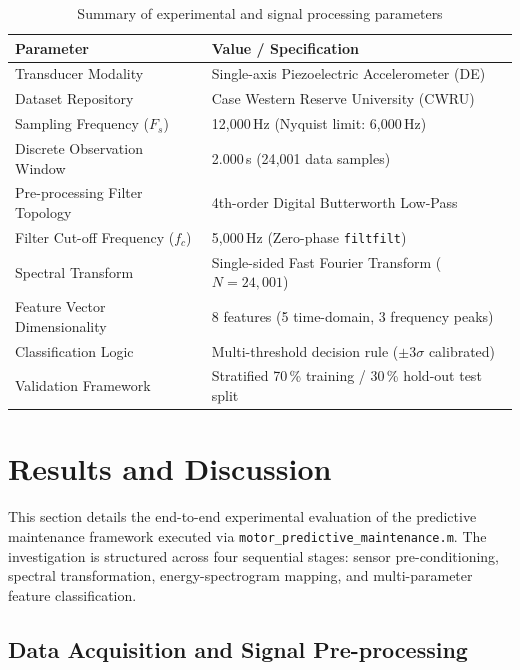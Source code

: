 \documentclass[12pt,a4paper]{article}
\begin{document}
\begin{table}[htbp]
\centering
\caption{Summary of experimental and signal processing parameters}
\begin{tabular}{@{}ll@{}}
\toprule
\textbf{Parameter} & \textbf{Value / Specification} \\
\midrule
Transducer Modality  & Single-axis Piezoelectric Accelerometer (DE) \\
Dataset Repository   & Case Western Reserve University (CWRU) \\
Sampling Frequency ($F_s$) & 12{,}000\,Hz (Nyquist limit: 6{,}000\,Hz) \\
Discrete Observation Window & 2.000\,s (24{,}001 data samples) \\
Pre-processing Filter Topology & 4th-order Digital Butterworth Low-Pass \\
Filter Cut-off Frequency ($f_c$) & 5{,}000\,Hz (Zero-phase \texttt{filtfilt}) \\
Spectral Transform   & Single-sided Fast Fourier Transform ($N = 24{,}001$) \\
Feature Vector Dimensionality & 8 features (5 time-domain, 3 frequency peaks) \\
Classification Logic & Multi-threshold decision rule ($\pm 3\sigma$ calibrated) \\
Validation Framework & Stratified 70\,\% training / 30\,\% hold-out test split \\
\bottomrule
\end{tabular}
\label{tab:setup}
\end{table}

\section{Results and Discussion}

This section details the end-to-end experimental evaluation of the
predictive maintenance framework executed via
\texttt{motor\_predictive\_maintenance.m}. The investigation is
structured across four sequential stages: sensor pre-conditioning,
spectral transformation, energy-spectrogram mapping, and multi-parameter
feature classification.

\subsection{Data Acquisition and Signal Pre-processing}
\end{document}
